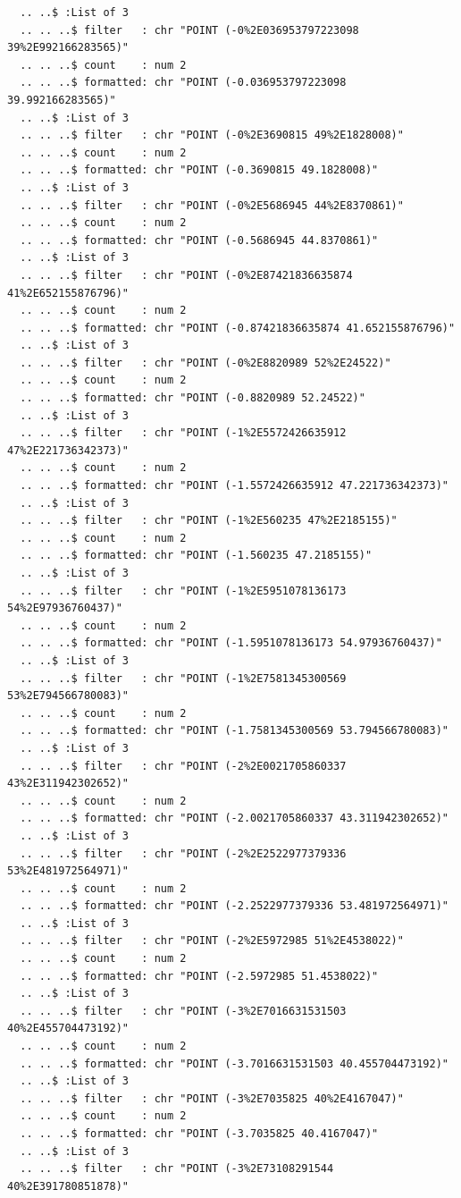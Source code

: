 \documentclass[
  letterpaper,
  DIV=11,
  numbers=noendperiod]{scrartcl}
\begin{document}
\begin{verbatim}
  .. ..$ :List of 3
  .. .. ..$ filter   : chr "POINT (-0%2E036953797223098 39%2E992166283565)"
  .. .. ..$ count    : num 2
  .. .. ..$ formatted: chr "POINT (-0.036953797223098 39.992166283565)"
  .. ..$ :List of 3
  .. .. ..$ filter   : chr "POINT (-0%2E3690815 49%2E1828008)"
  .. .. ..$ count    : num 2
  .. .. ..$ formatted: chr "POINT (-0.3690815 49.1828008)"
  .. ..$ :List of 3
  .. .. ..$ filter   : chr "POINT (-0%2E5686945 44%2E8370861)"
  .. .. ..$ count    : num 2
  .. .. ..$ formatted: chr "POINT (-0.5686945 44.8370861)"
  .. ..$ :List of 3
  .. .. ..$ filter   : chr "POINT (-0%2E87421836635874 41%2E652155876796)"
  .. .. ..$ count    : num 2
  .. .. ..$ formatted: chr "POINT (-0.87421836635874 41.652155876796)"
  .. ..$ :List of 3
  .. .. ..$ filter   : chr "POINT (-0%2E8820989 52%2E24522)"
  .. .. ..$ count    : num 2
  .. .. ..$ formatted: chr "POINT (-0.8820989 52.24522)"
  .. ..$ :List of 3
  .. .. ..$ filter   : chr "POINT (-1%2E5572426635912 47%2E221736342373)"
  .. .. ..$ count    : num 2
  .. .. ..$ formatted: chr "POINT (-1.5572426635912 47.221736342373)"
  .. ..$ :List of 3
  .. .. ..$ filter   : chr "POINT (-1%2E560235 47%2E2185155)"
  .. .. ..$ count    : num 2
  .. .. ..$ formatted: chr "POINT (-1.560235 47.2185155)"
  .. ..$ :List of 3
  .. .. ..$ filter   : chr "POINT (-1%2E5951078136173 54%2E97936760437)"
  .. .. ..$ count    : num 2
  .. .. ..$ formatted: chr "POINT (-1.5951078136173 54.97936760437)"
  .. ..$ :List of 3
  .. .. ..$ filter   : chr "POINT (-1%2E7581345300569 53%2E794566780083)"
  .. .. ..$ count    : num 2
  .. .. ..$ formatted: chr "POINT (-1.7581345300569 53.794566780083)"
  .. ..$ :List of 3
  .. .. ..$ filter   : chr "POINT (-2%2E0021705860337 43%2E311942302652)"
  .. .. ..$ count    : num 2
  .. .. ..$ formatted: chr "POINT (-2.0021705860337 43.311942302652)"
  .. ..$ :List of 3
  .. .. ..$ filter   : chr "POINT (-2%2E2522977379336 53%2E481972564971)"
  .. .. ..$ count    : num 2
  .. .. ..$ formatted: chr "POINT (-2.2522977379336 53.481972564971)"
  .. ..$ :List of 3
  .. .. ..$ filter   : chr "POINT (-2%2E5972985 51%2E4538022)"
  .. .. ..$ count    : num 2
  .. .. ..$ formatted: chr "POINT (-2.5972985 51.4538022)"
  .. ..$ :List of 3
  .. .. ..$ filter   : chr "POINT (-3%2E7016631531503 40%2E455704473192)"
  .. .. ..$ count    : num 2
  .. .. ..$ formatted: chr "POINT (-3.7016631531503 40.455704473192)"
  .. ..$ :List of 3
  .. .. ..$ filter   : chr "POINT (-3%2E7035825 40%2E4167047)"
  .. .. ..$ count    : num 2
  .. .. ..$ formatted: chr "POINT (-3.7035825 40.4167047)"
  .. ..$ :List of 3
  .. .. ..$ filter   : chr "POINT (-3%2E73108291544 40%2E391780851878)"

\end{verbatim}
\end{document}
